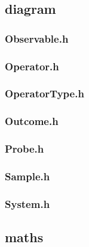 \subsection*{diagram}

\subsubsection*{Observable.h}


\subsubsection*{Operator.h}


\subsubsection*{OperatorType.h}


\subsubsection*{Outcome.h}


\subsubsection*{Probe.h}


\subsubsection*{Sample.h}


\subsubsection*{System.h}


\subsection*{maths}

